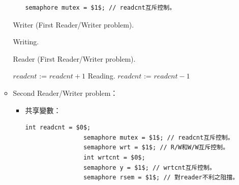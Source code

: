 \begin{itemize}
\begin{itemize}
\begin{itemize}
\begin{lstlisting}[caption={Shared variables of First Reader/Writer problem.}, captionpos=b, mathescape=true]
                semaphore mutex = $1$; // readcnt互斥控制。
            \end{lstlisting}
        \end{itemize}
        \begin{algorithm}[H]
            \caption{Writer (First Reader/Writer problem).}
            \begin{algorithmic}[1]
                    \Repeat
                        \State {}
                        \State Writing.
                        \State {}
                \EndFunction
            \end{algorithmic}
        \end{algorithm}
        \begin{algorithm}[H]
            \caption{Reader (First Reader/Writer problem).}
            \begin{algorithmic}[1]
                    \Repeat
                        \State {}
                        \State $readcnt$ := $readcnt + 1$
                         
                            \State {} 
                        \EndIf
                        \State {} 
                        \State Reading.
                        \State {}
                        \State $readcnt$ := $readcnt - 1$
                         
                            \State {} 
                        \EndIf
                        \State {}
                \EndFunction
            \end{algorithmic}
        \end{algorithm}
        \item Second Reader/Writer problem：\begin{itemize}
            \item 共享變數：\begin{lstlisting}[caption={Shared variables of Second Reader/Writer problem.}, captionpos=b, mathescape=true]
                int readcnt = $0$;
                semaphore mutex = $1$; // readcnt互斥控制。
                semaphore wrt = $1$; // R/W和W/W互斥控制。
                int wrtcnt = $0$;
                semaphore y = $1$; // wrtcnt互斥控制。
                semaphore rsem = $1$; // 對reader不利之阻擋。

\end{lstlisting}
\end{itemize}
\end{itemize}
\end{itemize}
